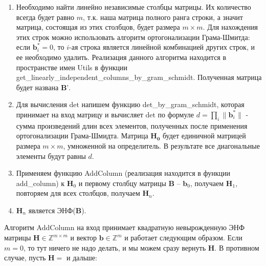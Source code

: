 \begin{enumerate}
\item Необходимо найти линейно независимые столбцы матрицы. Их количество всегда будет равно $ m $, т.к. наша матрица полного ранга строки, а значит матрица, состоящая из этих столбцов, будет размера $ m \times m $. Для нахождения этих строк можно использовать алгоритм ортогонализации Грама-Шмитда: если $ \mathbf{b}_i^\ast=0 $, то $ i $-ая строка является линейной комбинацией других строк, и ее необходимо удалить. Реализация данного алгоритма находится в пространстве имен Utils в функции get\_linearly\_independent\_columns\_by\_gram\_schmidt. Полученная матрица будет названа $  \mathbf{B}’ $.
\item Для вычисления $ \mathrm{det} $ напишем функцию det\_by\_gram\_schmidt, которая принимает на вход матрицу и вычисляет $ \mathrm{det} $ по формуле $ d=\prod_i{\|\mathbf{b}_i^\ast\|} $ - сумма произведений длин всех элементов, полученных после применения ортогонализации Грама-Шмидта. Матрица $ \mathbf{H}_\mathbf{0} $ будет единичной матрицей размера $ m \times m $, умноженной на определитель. В результате все диагональные элементы будут равны $ d $.
\item Применяем функцию AddColumn (реализация находится в функции add\_column) к $ \mathbf{H}_0 $ и первому столбцу матрицы $ \mathbf{B} $ -- $ \mathbf{b}_0 $, получаем $ \mathbf{H}_1 $, повторяем для всех столбцов, получаем $ \mathbf{H}_n $.
\item $ \mathbf{H}_n $ является ЭНФ($ \mathbf{B} $).
\end{enumerate}

Алгоритм AddColumn на вход принимает квадратную невырожденную ЭНФ матрицы $ \mathbf{H} \in \mathbb{Z}^{m \times m} $ и вектор $ \mathbf{b} \in \mathbb{Z}^m $ и работает следующим образом. Если $ m = 0 $, то тут ничего не надо делать, и мы можем сразу вернуть $ \mathbf{H} $. В противном случае, пусть $ \mathbf{H} = $ и дальше:

\clearpage